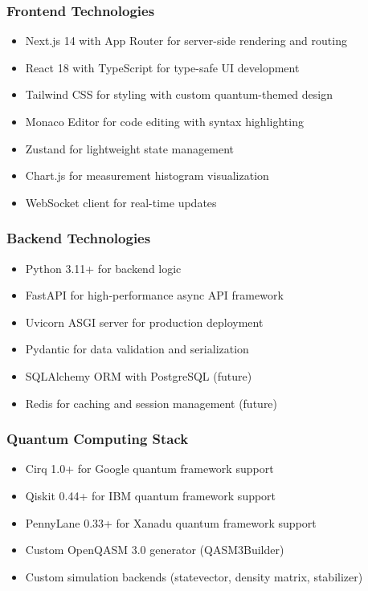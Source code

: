 \subsubsection{Frontend Technologies}
\begin{itemize}
    \item Next.js 14 with App Router for server-side rendering and routing
    \item React 18 with TypeScript for type-safe UI development
    \item Tailwind CSS for styling with custom quantum-themed design
    \item Monaco Editor for code editing with syntax highlighting
    \item Zustand for lightweight state management
    \item Chart.js for measurement histogram visualization
    \item WebSocket client for real-time updates
\end{itemize}

\subsubsection{Backend Technologies}
\begin{itemize}
    \item Python 3.11+ for backend logic
    \item FastAPI for high-performance async API framework
    \item Uvicorn ASGI server for production deployment
    \item Pydantic for data validation and serialization
    \item SQLAlchemy ORM with PostgreSQL (future)
    \item Redis for caching and session management (future)
\end{itemize}

\subsubsection{Quantum Computing Stack}
\begin{itemize}
    \item Cirq 1.0+ for Google quantum framework support \cite{cirq_developers_2023}
    \item Qiskit 0.44+ for IBM quantum framework support \cite{qiskit}
    \item PennyLane 0.33+ for Xanadu quantum framework support \cite{bergholm2018pennylane}
    \item Custom OpenQASM 3.0 generator (QASM3Builder) \cite{cross2021openqasm}
    \item Custom simulation backends (statevector, density matrix, stabilizer) \cite{nielsen2010quantum}
\end{itemize}


